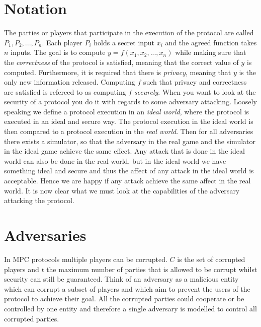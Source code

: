 \section{Notation}
The parties or players that participate in the execution of the protocol are called $P_1, P_2,...,P_n$. Each player $P_i$ holds a secret input $x_i$ and the agreed function takes $n$ inputs. The goal is to compute $y=f(x_1, x_2,...,x_n)$ while making sure that the \emph{correctness} of the protocol is satisfied, meaning that the correct value of $y$ is computed. Furthermore, it is required that there is \emph{privacy}, meaning that $y$ is the only new information released. Computing $f$ such that privacy and correctness are satisfied is refereed to as computing $f$ \emph{securely}. 
When you want to look at the security of a protocol you do it with regards to some adversary attacking. Loosely speaking we define a protocol execution in an \emph{ideal world}, where the protocol is executed in an ideal and secure way. The protocol execution in the ideal world is then compared to a protocol execution in the \emph{real world}. Then for all adversaries there exists a simulator, so that the adversary in the real game and the simulator in the ideal game achieve the same effect. Any attack that is done in the ideal world can also be done in the real world, but in the ideal world we have something ideal and secure and thus the affect of any attack in the ideal world is acceptable. Hence we are happy if any attack achieve the same affect in the real world. 
It is now clear what we must look at the capabilities of the adversary attacking the protocol.

\section{Adversaries} 

In MPC protocols multiple players can be corrupted. $C$ is the set of corrupted players and $t$ the maximum number of parties that is allowed to be corrupt whilst security can still be guaranteed. Think of an adversary as a malicious entity which can corrupt a subset of players and which aim to prevent the users of the protocol to achieve their goal. All the corrupted parties could cooperate or be controlled by one entity and therefore a single adversary is modelled to control all corrupted parties\cite{mpc-book}.

